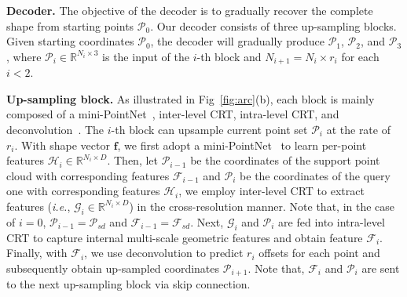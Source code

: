 \documentclass[letterpaper]{article} %
\newcommand{\ve}[1]{\mathbf{#1}} %
\begin{document}
{\bf Decoder.}
The objective of the decoder is to gradually recover the complete shape from starting points $\mathcal{P}_0$.
Our decoder consists of three up-sampling blocks.
Given starting coordinates ${\mathcal  P}_0$, the decoder will gradually produce ${\mathcal P}_1$, ${\mathcal P}_2$, and ${\mathcal P}_3$,  where ${\mathcal P}_{i} \in \mathbb{R}^{N_i \times 3}$ is the input of the $i$-th block and $N_{i+1}=N_{i} \times r_i$ for each $i<2$.

{\bf Up-sampling block.}
As illustrated in Fig~\ref{fig:arc}(b), each block is mainly composed of a mini-PointNet~\cite{qi2017pointnet}, inter-level CRT, intra-level CRT, and deconvolution~\cite{xiang2021snowflakenet}. 
The $i$-th block can upsample current point set $\mathcal{P}_{i}$ at the rate of $r_i$. 
With shape vector $\ve f$,  we first adopt a mini-PointNet~\cite{qi2017pointnet} to learn per-point features $\mathcal{H}_i \in \mathbb{R}^{N_i \times D}$.
Then, let $\mathcal{P}_{i-1}$ be the coordinates of the support point cloud with corresponding features $\mathcal{F}_{i-1}$ and $\mathcal{P}_{i}$ be the coordinates of the query one with corresponding features $\mathcal{H}_{i}$,  we employ inter-level CRT to extract features ({\em i.e.}, ${{\mathcal G}_i \in {\mathbb R}^{N_i \times D}}$) in the cross-resolution manner. 
Note that, in the case of $i=0$, ${\mathcal P}_{i-1}={\mathcal P}_{sd}$ and ${\mathcal F}_{i-1}={\mathcal F}_{sd}$. 
Next, ${\mathcal G}_i$ and ${\mathcal P}_i$ are fed into intra-level CRT to capture internal multi-scale geometric features and obtain feature $\mathcal{F}_i$. Finally, with $\mathcal{F}_i$, we use deconvolution to predict $r_i$ offsets for each point and subsequently obtain up-sampled coordinates ${\mathcal P}_{i+1}$.
Note that, $\mathcal{F}_i$ and $\mathcal{P}_i$ are sent to the next up-sampling block via skip connection. 
\end{document}
